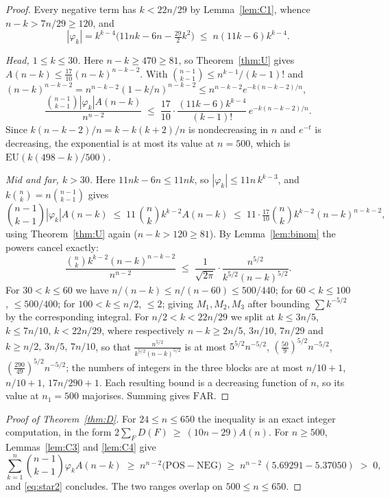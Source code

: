 \documentclass[11pt,a4paper]{amsart}
\theoremstyle{plain}
\theoremstyle{definition}
\begin{document}
\begin{proof}
Every negative term has $k<22n/29$ by Lemma~\ref{lem:C1}, whence
$n-k>7n/29\ge120$, and
\[
  |\varphi_k| = k^{k-4}\big(11nk-6n-\tfrac{29}{2}k^2\big)
  \;\le\; n(11k-6)k^{k-4} .
\]

\emph{Head, $1 \le k \le 30$.} Here $n-k \ge 470 \ge 81$, so
Theorem~\ref{thm:U} gives $A(n-k)\le\frac{17}{10}(n-k)^{n-k-2}$. With
$\binom{n-1}{k-1}\le n^{k-1}/(k-1)!$ and
$(n-k)^{n-k-2} = n^{n-k-2}(1-k/n)^{n-k-2}\le n^{n-k-2}e^{-k(n-k-2)/n}$,
\[
  \frac{\binom{n-1}{k-1}|\varphi_k|A(n-k)}{n^{n-2}}
  \;\le\; \frac{17}{10}\cdot\frac{(11k-6)k^{k-4}}{(k-1)!}\,
          e^{-k(n-k-2)/n}.
\]
Since $k(n-k-2)/n = k-k(k+2)/n$ is nondecreasing in $n$ and $e^{-t}$ is
decreasing, the exponential is at most its value at $n=500$, which is
$\mathrm{EU}(k(498-k)/500)$.

\emph{Mid and far, $k>30$.} Here $11nk-6n\le 11nk$, so
$|\varphi_k|\le 11n\,k^{k-3}$, and $k\binom{n}{k}=n\binom{n-1}{k-1}$ gives
\[
  \binom{n-1}{k-1}|\varphi_k|A(n-k)
  \;\le\; 11\,\binom{n}{k}k^{k-2}A(n-k)
  \;\le\; 11\cdot\tfrac{17}{10}\binom{n}{k}k^{k-2}(n-k)^{n-k-2},
\]
using Theorem~\ref{thm:U} again ($n-k>120\ge81$). By Lemma~\ref{lem:binom} the
powers cancel exactly:
\[
  \frac{\binom{n}{k}k^{k-2}(n-k)^{n-k-2}}{n^{n-2}}
  \;\le\; \frac{1}{\sqrt{2\pi}}\cdot\frac{n^{5/2}}{k^{5/2}(n-k)^{5/2}} .
\]
For $30<k\le60$ we have $n/(n-k)\le n/(n-60)\le 500/440$; for $60<k\le100$,
$\le 500/400$; for $100<k\le n/2$, $\le 2$; giving $M_1,M_2,M_3$ after bounding
$\sum k^{-5/2}$ by the corresponding integral. For $n/2<k<22n/29$ we split at
$k \le 3n/5$, $k \le 7n/10$, $k<22n/29$, where respectively
$n-k \ge 2n/5,\,3n/10,\,7n/29$ and $k \ge n/2,\,3n/5,\,7n/10$, so that
$\frac{n^{5/2}}{k^{5/2}(n-k)^{5/2}}$ is at most
$5^{5/2}n^{-5/2}$, $(\tfrac{50}{9})^{5/2}n^{-5/2}$,
$(\tfrac{290}{49})^{5/2}n^{-5/2}$; the numbers of integers in the three blocks
are at most $n/10+1$, $n/10+1$, $17n/290+1$. Each resulting bound is a decreasing
function of $n$, so its value at $n_1=500$ majorises. Summing gives
$\mathrm{FAR}$.
\end{proof}

\begin{proof}[Proof of Theorem~\ref{thm:D}]
For $24 \le n \le 650$ the inequality is an exact integer computation, in the
form $2\sum_F D(F)\ \ge\ (10n-29)A(n)$. For
$n \ge 500$, Lemmas~\ref{lem:C3} and \ref{lem:C4} give
\[
  \sum_{k=1}^{n}\binom{n-1}{k-1}\varphi_k A(n-k)
  \;\ge\; n^{n-2}\big(\mathrm{POS}-\mathrm{NEG}\big)
  \;\ge\; n^{n-2}\,(5.69291-5.37050) \;>\;0 ,
\]
and \eqref{eq:star2} concludes. The two ranges overlap on $500 \le n \le 650$.
\end{proof}
\end{document}
